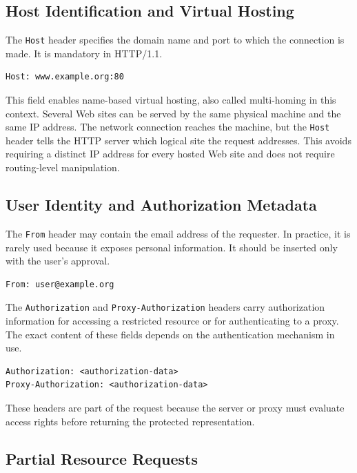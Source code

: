 \documentclass{scrbook}
\begin{document}
\subsection{Host Identification and Virtual Hosting}

The \texttt{Host} header specifies the domain name and port to which the connection is made. It is mandatory in HTTP/1.1.

\begin{lstlisting}
Host: www.example.org:80
\end{lstlisting}

This field enables name-based virtual hosting, also called multi-homing in this context. Several Web sites can be served by the same physical machine and the same IP address. The network connection reaches the machine, but the \texttt{Host} header tells the HTTP server which logical site the request addresses. This avoids requiring a distinct IP address for every hosted Web site and does not require routing-level manipulation.

\subsection{User Identity and Authorization Metadata}

The \texttt{From} header may contain the email address of the requester. In practice, it is rarely used because it exposes personal information. It should be inserted only with the user's approval.

\begin{lstlisting}
From: user@example.org
\end{lstlisting}

The \texttt{Authorization} and \texttt{Proxy-Authorization} headers carry authorization information for accessing a restricted resource or for authenticating to a proxy. The exact content of these fields depends on the authentication mechanism in use.

\begin{lstlisting}
Authorization: <authorization-data>
Proxy-Authorization: <authorization-data>
\end{lstlisting}

These headers are part of the request because the server or proxy must evaluate access rights before returning the protected representation.

\subsection{Partial Resource Requests}
\end{document}
